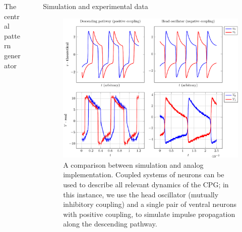 \documentclass[final]{beamer}
\newlength{\sepwidth}
\newlength{\colwidth}
\newcommand{\separatorcolumn}{\begin{column}{\sepwidth}\end{column}}
\begin{document}
\begin{frame}[t]
\begin{columns}[t]
\begin{column}{\colwidth}
\begin{block}{The central pattern generator}

  \end{block}

\end{column}

\separatorcolumn

\begin{column}{\colwidth}

  \begin{block}{Simulation and experimental data}

    \begin{figure}
        \includegraphics[width=0.7\colwidth]{figures/anal_sim/anal_sim}
        \caption{A comparison between simulation and analog implementation.  Coupled systems of neurons can be used to describe all relevant dynamics of the CPG; in this instance, we use the head oscillator (mutually inhibitory coupling) and a single pair of ventral neurons with positive coupling, to simulate impulse propagation along the descending pathway.}
    \end{figure}


\end{block}
\end{column}
\end{columns}
\end{frame}
\end{document}
